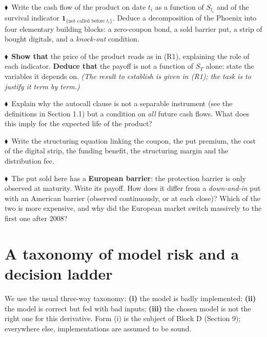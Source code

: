 \documentclass[11pt,a4paper]{article}
\newcommand{\indiv}{\textcolor{indivred}{$\blacklozenge$}}
\begin{document}
\begin{questions}
  \item \indiv\ Write the cash flow of the product on date $t_i$ as a function of $S_{t_i}$ and of the survival indicator
  $\mathbf{1}_{\{\text{not called before } t_i\}}$. Deduce a decomposition of the Phoenix into four elementary building blocks:
  a zero-coupon bond, a sold barrier put, a strip of bought digitals, and a \emph{knock-out} condition.

  \item \indiv\ \textbf{Show that} the price of the product reads as in (R1), explaining the role of each indicator.
  \textbf{Deduce that} the payoff is not a function of $S_T$ alone: state the variables it depends on. \emph{(The
  result to establish is given in (R1); the task is to justify it term by term.)}

  \item \indiv\ Explain why the autocall clause is not a separable instrument (see the definitions in Section 1.1)
  but a condition on \emph{all} future cash flows. What does this imply for the expected life of the
  product?

  \item \indiv\ Write the structuring equation linking the coupon, the put premium, the cost of the digital
  strip, the funding benefit, the structuring margin and the distribution fee.

  \item \indiv\ The put sold here has a \textbf{European barrier}: the protection barrier is only observed at maturity.
  Write its payoff. How does it differ from a \emph{down-and-in} put with an American barrier
  (observed continuously, or at each close)? Which of the two is more expensive, and why did the
  European market switch massively to the first one after 2008?
\end{questions}

\section{A taxonomy of model risk and a decision ladder}

We use the usual three-way taxonomy: \textbf{(i)} the model is badly implemented; \textbf{(ii)} the model is correct
but fed with bad inputs; \textbf{(iii)} the chosen model is not the right one for this derivative. Form (i) is the
subject of Block D (Section 9); everywhere else, implementations are assumed to be sound.
\end{document}
